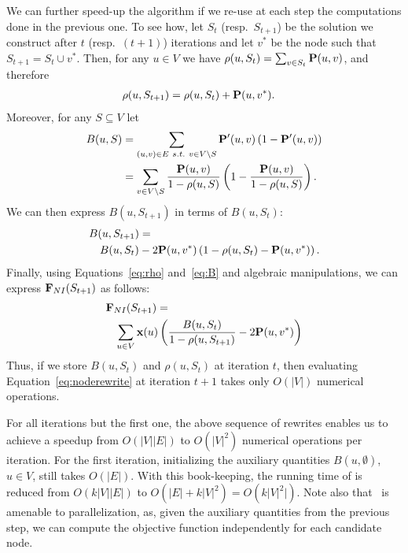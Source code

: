 We can further speed-up the algorithm if 
we re-use at each step the computations 
done in the previous one.
To see how, let $S_t$ (resp.\ $S_{t+1}$) 
be the solution we construct after
$t$ (resp.\ $(t+1)$) iterations and 
let $v^\ast$ be the node such that
$S_{t+1}=S_t\cup v^\ast$. 
Then, for any $u\in V$ we have $
\rho(u,S_t) = \sum_{v\in S_t}\mathbf{P}(u,v)
$, and therefore
\begin{eqnarray}\label{eq:rho}
\rho(u,S_{t+1}) & = \rho(u,S_{t})+ \mathbf{P}(u,v^\ast).
\end{eqnarray}
Moreover, for any $S\subseteq V$ let
\begin{align}
B(u,S) & = \sum_{(u,v)\in E\ s.t.\ v\in V\setminus S}\mathbf{P}^{\prime}(u,v)\left(1-\mathbf{P}^{\prime}(u,v)\right) \\
& = \sum_{v\in V\setminus S}\frac{\mathbf{P}(u,v)}{1-\rho(u,S)}\left(1-\frac{\mathbf{P}(u,v)}{1-\rho(u,S)}\right)\nonumber .	
\end{align}
We can then express $B(u,S_{t+1})$ in terms of
$B(u, S_{t})$:
\begin{eqnarray}\label{eq:B}
\lefteqn{
B(u,S_{t+1})  =} \nonumber \\
& & B(u,S_t)-2\transition(u,v^\ast)\left(1-\rho(u,S_t)-\transition(u,v^\ast)\right). 
\end{eqnarray}
Finally, using Equations~\eqref{eq:rho} and~\eqref{eq:B} 
and algebraic manipulations,
we can express $\mathbf{F}_{{\sc NI}}(S_{t+1})$ as follows:
\begin{eqnarray}\label{eq:noderewrite}
\lefteqn{
\objective_{\shortnodeitems}(S_{t+1}) = }\\
&&\sum_{u\in V}\initial(u)\left(\frac{B(u,S_t)}{1-\rho(u,S_{t+1})}-2\transition(u,v^\ast)\right)\nonumber
\end{eqnarray}
Thus, if we store $B(u,S_t)$ and $\rho(u,S_t)$ at iteration $t$, 
then evaluating 
Equation~\eqref{eq:noderewrite} at iteration $t+1$
takes only $O(|V|)$ numerical operations.

For all iterations but the first one,
the above sequence of rewrites enables us to achieve 
a speedup from $O(|V||E|)$ to $O(|V|^2)$ numerical operations
per iteration.
For the first iteration, initializing
the auxiliary quantities $B(u, \emptyset)$, $u\in V$, still takes
$O(|E|)$.
With this book-keeping, the running time of {\nodegreedy} is  reduced
from $O(k|V||E|)$ to $O(|E| + k|V|^2) = O(k|V|^2|)$.
Note also that \nodegreedy\ is amenable to parallelization,
as, given the auxiliary quantities from the previous step, 
we can compute the objective function independently for each 
candidate node.



